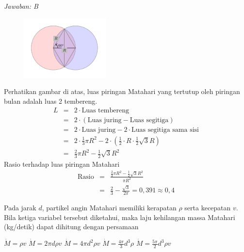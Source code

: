 \documentclass[11pt,fleqn, a4paper]{exam}
\begin{document}
\begin{questions}
\textit{Jawaban: B} \\
\begin{figure}[H]
\centering
\includegraphics[width=0.4\textwidth]{gambar/duaLingkaran_jwb.pdf}
\end{figure}
Perhatikan gambar di atas, luas piringan Matahari yang tertutup oleh piringan bulan adalah luas 2 tembereng. 
\begin{eqnarray*}
L &=& 2 \cdot \text{Luas tembereng}\\
&=& 2 \cdot (\text{Luas juring} - \text{Luas segitiga})\\
&=& 2 \cdot \text{Luas juring} - 2 \cdot \text{Luas segitiga sama sisi}\\
&=& 2 \cdot \frac{1}{3} \pi R^{2} - 2 \cdot \left( \frac{1}{2} \cdot R \cdot \frac{1}{2} \sqrt{3} R \right) \\
&=& \frac{2}{3} \pi R^{2} - \frac{1}{2} \sqrt{3} R^{2} 
\end{eqnarray*}
Rasio terhadap luas piringan Matahari
\begin{eqnarray*}
\text{Rasio} &=& \frac{\frac{2}{3} \pi R^{2} - \frac{1}{2} \sqrt{3} R^{2}}{\pi R^{2}}\\
&=& \frac{2}{3} - \frac{\sqrt{3}}{2 \pi} = 0,391 \approx 0,4
\end{eqnarray*}

\vspace{0.5cm}
\question Pada jarak $d$, partikel angin Matahari memiliki kerapatan $\rho$ serta kecepatan $v$. Bila ketiga variabel tersebut diketahui, maka laju kehilangan massa Matahari (kg/detik) dapat dihitung dengan persamaan
\begin{choices}
\choice $\dot{M}=\rho v$
\choice $\dot{M}=2\pi d \rho v$
\choice $\dot{M}=4\pi d^2 \rho v$
\choice $\dot{M}=\frac{4\pi}{3}d^3 \rho$
\choice $\dot{M}=\frac{5\pi}{2}d^3 \rho v$
\end{choices}


\end{questions}
\end{document}
